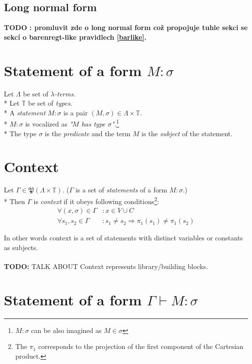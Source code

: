 \documentclass[12pt,a4paper]{report}
\newcommand{\lterms}{$\lambda$-terms\xspace}
\newcommand{\turst}[3]{$#1 \vdash #2 : #3$\xspace}
\newcommand{\GMS}{\turst{\Gamma}{M}{\sigma}}
\begin{document}
\subsection{Long normal form}
\label{lnf}

\textbf{TODO : promluvit zde o long normal form což propojuje 
		  tuhle sekci se sekcí o barenregt-like 	
		  pravidlech \ref{barlike}.
}


	
\section{Statement of a form $M : \sigma$}

	Let $\Lambda$ be set of {\it \lterms}. \\*
	Let $\mathbb{T}$ be set of {\it types}.       \\*
	A {\it statement} $M : \sigma$ is a pair $(M,\sigma) \in \Lambda \times \mathbb{T}$. \\*
	$M : \sigma$ is vocalized as {\it "$M$ has type $\sigma$"}.\footnote{ 
	$M : \sigma$ can be also imagined as $M \in \sigma$ } \\*
	The type $\sigma$ is the {\it predicate} and the term $M$ is the
	{\it subject} of the statement.  
	
\section{Context}

	Let $\Gamma \in \mathfrak P \left({\Lambda \times  \mathbb{T}}\right)$. 
	($\Gamma$ is a set of {\it statements} of a form $M : \sigma$.)	\\*
	Then $\Gamma$ is {\it context} if it obeys following 
	conditions\footnote{
	The $\pi_1$ corresponds to the projection of the first component of the Cartesian product.
	}:
	\begin{align*}
		 \forall (x,\sigma) \in \Gamma &: x \in V \cup C \\
		 \forall s_1,s_2 \in \Gamma &: s_1 \neq s_2 \Rightarrow \pi_1(s_1) \neq \pi_1(s_2)
    \end{align*}
    
	In other words context is a set of statements with distinct variables or constants as subjects.
	\\\\
	\textbf{TODO:} TALK ABOUT Context represents library/building blocks.
	
	
\section{Statement of a form \GMS}
\end{document}
